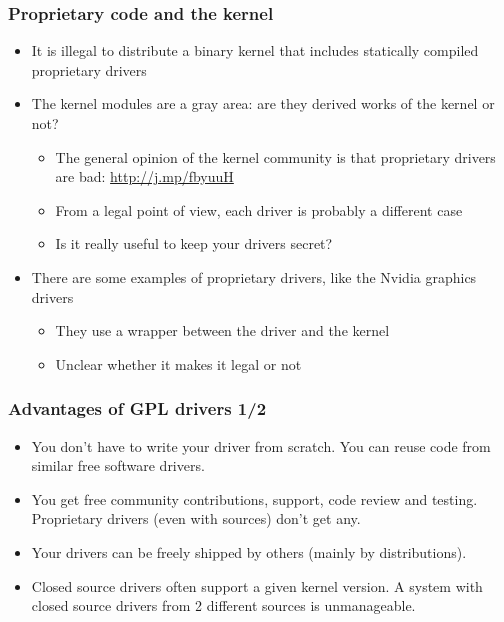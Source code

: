 \begin{frame}
  \frametitle{Proprietary code and the kernel}
  \begin{itemize}
  \item It is illegal to distribute a binary kernel that includes
    statically compiled proprietary drivers
  \item The kernel modules are a gray area: are they derived works of
    the kernel or not?
    \begin{itemize}
    \item The general opinion of the kernel community is that
      proprietary drivers are bad: \url{http://j.mp/fbyuuH}
    \item From a legal point of view, each driver is probably a
      different case
    \item Is it really useful to keep your drivers secret?
    \end{itemize}
  \item There are some examples of proprietary drivers, like the
    Nvidia graphics drivers
    \begin{itemize}
    \item They use a wrapper between the driver and the kernel
    \item Unclear whether it makes it legal or not
    \end{itemize}
  \end{itemize}
\end{frame}

\begin{frame}
  \frametitle{Advantages of GPL drivers 1/2}
  \begin{itemize}
  \item You don't have to write your driver from scratch. You can
    reuse code from similar free software drivers.
  \item You get free community contributions, support, code review and
    testing.  Proprietary drivers (even with sources) don't get any.
  \item Your drivers can be freely shipped by others (mainly by
    distributions).
  \item Closed source drivers often support a given kernel version. A
    system with closed source drivers from 2 different sources is
    unmanageable.
  \end{itemize}
\end{frame}

